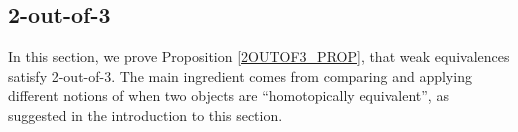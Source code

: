 \documentclass[a4paper,10pt
,draft
]{article}%
\renewcommand{\1}{\eta}%
\begin{document}

% 





\subsection{2-out-of-3}

In this section, we prove Proposition \ref{2OUTOF3_PROP}, that weak equivalences satisfy 2-out-of-3.
%
The main ingredient comes from comparing and applying different notions of when two objects are ``homotopically equivalent'', as suggested in the introduction to this section.
\end{document}
